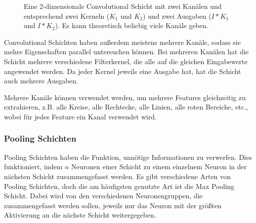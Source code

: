 \documentclass[10pt]{article}
\begin{document}
\begin{figure}[h!]
{
    }
    \caption{Eine 2-dimensionale Convolutional Schicht mit zwei Kanälen und entsprechend zwei Kerneln ($K_1$ und $K_2$) und zwei Ausgaben ($I*K_1$ und $I*K_2$). Es kann theoretisch beliebig viele Kanäle geben.}
    \label{fig:conv_layers_channels}
\end{figure}

Convolutional Schichten haben außerdem meistens mehrere Kanäle, sodass sie mehre Eigenschaften parallel untersuchen können. 
Bei mehreren Kanälen hat die Schicht mehrere verschiedene Filterkernel, die alle auf die gleichen Eingabewerte angewendet werden.
Da jeder Kernel jeweils eine Ausgabe hat, hat die Schicht auch mehrere Ausgaben.


Mehrere Kanäle können verwendet werden, um mehrere Features gleichzeitig zu extrahieren, z.B. alle Kreise, alle Rechtecke, alle Linien, alle roten Bereiche, etc., wobei für jedes Feature ein Kanal verwendet wird.

\subsubsection{Pooling Schichten}

Pooling Schichten haben die Funktion, unnötige Informationen zu verwerfen. 
Dies funktioniert, indem $n$ Neuronen einer Schicht zu einem einzelnem Neuron in der nächsten Schicht zusammengefasst werden.
Es gibt verschiedene Arten von Pooling Schichten, doch die am häufigsten genutzte Art ist die Max Pooling Schicht. 
Dabei wird von den verschiedenen Neuronengruppen, die zusammengefasst werden sollen, jeweils nur das Neuron mit der größten Aktivierung an die nächste Schicht weitergegeben.
\end{document}
